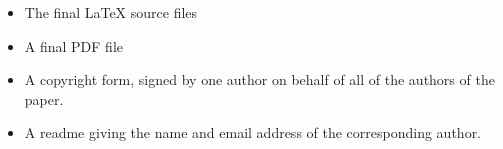 \documentclass[runningheads,a4paper]{llncs}
\begin{document}


% 
% 
% 
% 
% 
% 
% 
% 


\begin{itemize}
\settowidth{\leftmargin}{{\Large$\square$}}\advance\leftmargin{}
\itemsep8pt\relax
\renewcommand\labelitemi{{\lower1.5pt\hbox{\Large$\square$}}}

\item The final \LaTeX{} source files
\item A final PDF file
\item A copyright form, signed by one author on behalf of all of the
authors of the paper.
\item A readme giving the name and email address of the
corresponding author.
\end{itemize}
\end{document}
